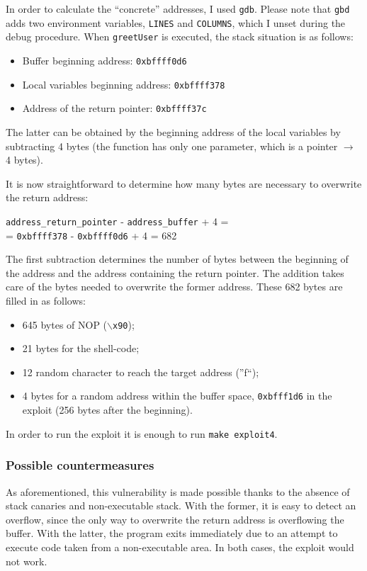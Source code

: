 In order to calculate the ``concrete'' addresses, I used \texttt{gdb}. Please note that \texttt{gbd} adds two environment variables, \texttt{LINES} and \texttt{COLUMNS}, which I unset during the debug procedure. When \texttt{greetUser} is executed, the stack situation is as follows:
\begin{itemize}
	\item Buffer beginning address: \texttt{0xbffff0d6}
	\item Local variables beginning address: \texttt{0xbffff378}
	\item Address of the return pointer: \texttt{0xbffff37c}
\end{itemize}
The latter can be obtained by the beginning address of the local variables by subtracting 4 bytes (the function has only one parameter, which is a pointer $\rightarrow$ 4 bytes).

It is now straightforward to determine how many bytes are necessary to overwrite the return address:

\begin{center}
	\texttt{address\_return\_pointer} - \texttt{address\_buffer} + 4 =\\
	= \texttt{0xbffff378} - \texttt{0xbffff0d6} + 4 = 682
\end{center}

The first subtraction determines the number of bytes between the beginning of the address and the address containing the return pointer. The addition takes care of the bytes needed to overwrite the former address. These 682 bytes are filled in as follows:
\begin{itemize}
	\item 645 bytes of NOP (\texttt{$\backslash$x90});
	\item 21 bytes for the shell-code;
	\item 12 random character to reach the target address (''f``);
	\item 4 bytes for a random address within the buffer space, \texttt{0xbfff1d6} in the exploit (256 bytes after the beginning).
\end{itemize}

In order to run the exploit it is enough to run \texttt{make exploit4}.

\subsubsection{Possible countermeasures}
As aforementioned, this vulnerability is made possible thanks to the absence of stack canaries and non-executable stack. With the former, it is easy to detect an overflow, since the only way to overwrite the return address is overflowing the buffer. With the latter, the program exits immediately due to an attempt to execute code taken from a non-executable area. In both cases, the exploit would not work. 

